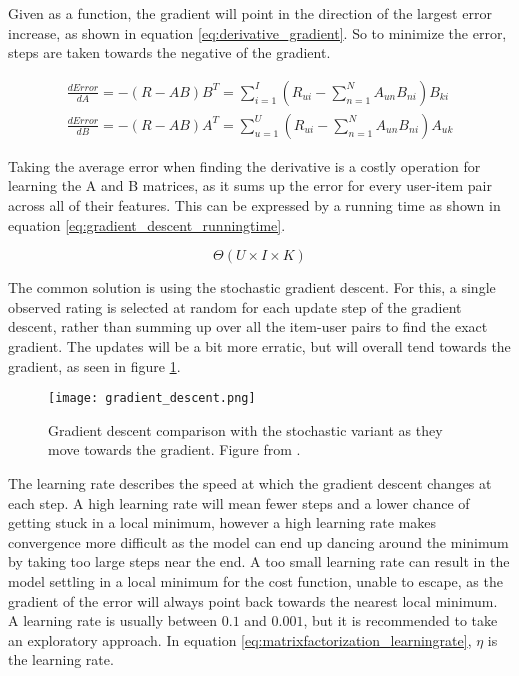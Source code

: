 Given as a function, the gradient will point in the direction of the largest error increase, as shown in equation \ref{eq:derivative_gradient}. So to minimize the error, steps are taken towards the negative of the gradient.

\begin{equation}\label{eq:derivative_gradient}
	\begin{split}
	\frac{dError}{dA}=-(R-AB)B^T = \sum_{i=1}^{I}(R_{ui} - \sum_{n=1}^{N} A_{un}B_{ni})B_{ki}
	\\
	\frac{dError}{dB}=-(R-AB)A^T = \sum_{u=1}^{U}(R_{ui} - \sum_{n=1}^{N} A_{un}B_{ni})A_{uk}
	\end{split}
\end{equation}

Taking the average error when finding the derivative is a costly operation for learning the A and B matrices, as it sums up the error for every user-item pair across all of their features. This can be expressed by a running time as shown in equation \ref{eq:gradient_descent_runningtime}.

\begin{equation}\label{eq:gradient_descent_runningtime}
	\Theta(U\times I \times K)
\end{equation}

The common solution is using the stochastic gradient descent. For this, a single observed rating is selected at random for each update step of the gradient descent, rather than summing up over all the item-user pairs to find the exact gradient. The updates will be a bit more erratic, but will overall tend towards the gradient, as seen in figure \ref{fig:gradientDescent}.

\begin{figure}\label{fig:gradientDescent}
	\centering
	\texttt{[image: gradient\_descent.png]}
	\caption{Gradient descent comparison with the stochastic variant as they move towards the gradient. Figure from \cite{Thiesson}.}
\end{figure}

The learning rate describes the speed at which the gradient descent changes at each step. A high learning rate will mean fewer steps and a lower chance of getting stuck in a local minimum, however a high learning rate makes convergence more difficult as the model can end up dancing around the minimum by taking too large steps near the end. A too small learning rate can result in the model settling in a local minimum for the cost function, unable to escape, as the gradient of the error will always point back towards the nearest local minimum. A learning rate is usually between $0.1$ and $0.001$, but it is recommended to take an exploratory approach. In equation \ref{eq:matrixfactorization_learningrate}, $\eta$ is the learning rate.

